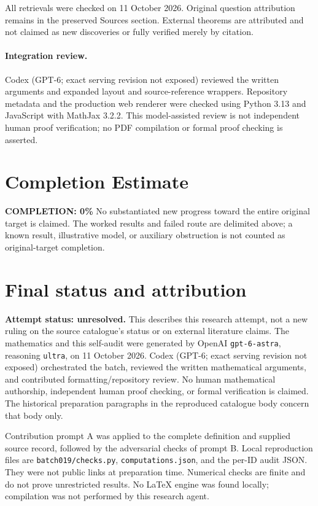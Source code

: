 \documentclass[11pt]{article}
\begin{document}
All retrievals were checked on 11 October 2026. Original question attribution remains in the preserved Sources section. External theorems are attributed and not claimed as new discoveries or fully verified merely by citation.


\paragraph{Integration review.} Codex (GPT-6; exact serving revision not exposed) reviewed the written arguments and expanded layout and source-reference wrappers. Repository metadata and the production web renderer were checked using Python 3.13 and JavaScript with MathJax 3.2.2. This model-assisted review is not independent human proof verification; no PDF compilation or formal proof checking is asserted.

\section{Completion Estimate}
\noindent\textbf{COMPLETION: 0\%}
No substantiated new progress toward the entire original target is claimed. The worked results and failed route are delimited above; a known result, illustrative model, or auxiliary obstruction is not counted as original-target completion.

\section{Final status and attribution}
\textbf{Attempt status: unresolved.} This describes this research attempt, not a new ruling on the source catalogue's status or on external literature claims.
The mathematics and this self-audit were generated by OpenAI \texttt{gpt-6-astra}, reasoning \texttt{ultra}, on 11 October 2026. Codex (GPT-6; exact serving revision not exposed) orchestrated the batch, reviewed the written mathematical arguments, and contributed formatting/repository review. No human mathematical authorship, independent human proof checking, or formal verification is claimed. The historical preparation paragraphs in the reproduced catalogue body concern that body only.

Contribution prompt A was applied to the complete definition and supplied source record, followed by the adversarial checks of prompt B. Local reproduction files are \texttt{batch019/checks.py}, \texttt{computations.json}, and the per-ID audit JSON. They were not public links at preparation time. Numerical checks are finite and do not prove unrestricted results. No LaTeX engine was found locally; compilation was not performed by this research agent.
\end{document}
